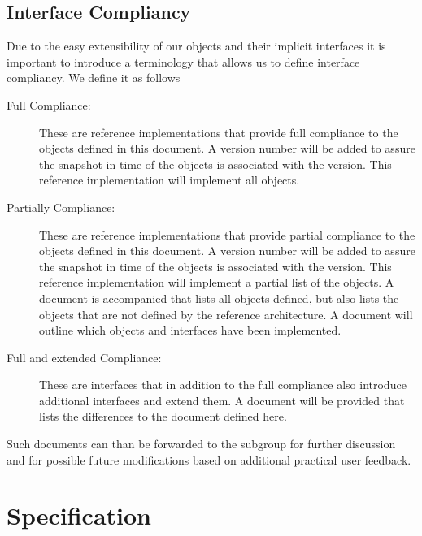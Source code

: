 \documentclass[10pt]{article}
\begin{document}
\subsection{Interface Compliancy}

Due to the easy extensibility of our objects and their implicit
interfaces it is important to introduce a terminology that allows us
to define interface compliancy. We define it as follows

\begin{description}

\item[Full Compliance:] These are reference implementations that
  provide full compliance to the objects defined in this document. A
  version number will be added to assure the snapshot in time of the
  objects is associated with the version. This reference
  implementation will implement all objects.

\item[Partially Compliance:] These are reference implementations that
  provide partial compliance to the objects defined in this
  document. A version number will be added to assure the snapshot in
  time of the objects is associated with the version. This reference
  implementation will implement a partial list of the objects. A
  document is accompanied that lists all objects defined, but also
  lists the objects that are not defined by the reference
  architecture. A document will outline which objects and interfaces
  have been implemented.

\item[Full and extended Compliance:] These are interfaces that in
  addition to the full compliance also introduce additional interfaces
  and extend them. A document will be provided that lists the
  differences to the document defined here.

\end{description}

Such documents can than be forwarded to the subgroup for further
discussion and for possible future modifications based on additional
practical user feedback.



\section{Specification}
\end{document}
